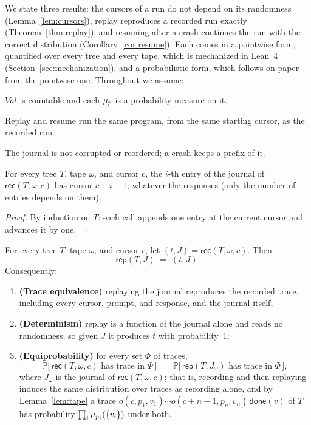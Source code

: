 
We state three results: the cursors of a run do not depend on its randomness
(Lemma~\ref{lem:cursors}), replay reproduces a recorded run exactly
(Theorem~\ref{thm:replay}), and resuming after a crash continues the run with the
correct distribution (Corollary~\ref{cor:resume}).
Each comes in a pointwise form, quantified over every tree and every tape, which is
mechanized in Lean~4 (Section~\ref{sec:mechanization}), and a probabilistic form, which
follows on paper from the pointwise one.
Throughout we assume:
\begin{description}[noitemsep]
  \item[(A1)] $\mathit{Val}$ is countable and each $\mu_{p}$ is a probability measure on it.
  \item[(A2)] Replay and resume run the same program, from the same starting cursor, as the
    recorded run.
  \item[(A3)] The journal is not corrupted or reordered; a crash keeps a prefix of it.
\end{description}

\begin{lemma}[Cursors]
\label{lem:cursors}
For every tree $T$, tape $\omega$, and cursor $c$, the $i$-th entry of the journal of
$\mathsf{rec}(T, \omega, c)$ has cursor $c+i-1$, whatever the responses (only the number of
entries depends on them).
\end{lemma}

\begin{proof}
By induction on $T$: each call appends one entry at the current cursor and advances it by one.
\end{proof}

\begin{theorem}
\label{thm:replay}
For every tree $T$, tape $\omega$, and cursor $c$, let $(t, J) = \mathsf{rec}(T, \omega, c)$.
Then
\[
  \mathsf{rep}(T, J) \;=\; (t, J).
\]
Consequently:
\begin{enumerate}[label=(\roman*), noitemsep]
  \item \textbf{(Trace equivalence)} replaying the journal reproduces the recorded trace,
    including every cursor, prompt, and response, and the journal itself;
  \item \textbf{(Determinism)} replay is a function of the journal alone and reads no
    randomness, so given $J$ it produces $t$ with probability~1;
  \item \textbf{(Equiprobability)} for every set $\Phi$ of traces,
    \[
      \mathbb{P}\bigl[\,\mathsf{rec}(T,\omega,c) \text{ has trace in } \Phi\,\bigr]
      \;=\;
      \mathbb{P}\bigl[\,\mathsf{rep}(T, J_\omega) \text{ has trace in } \Phi\,\bigr],
    \]
    where $J_\omega$ is the journal of $\mathsf{rec}(T,\omega,c)$; that is, recording and then
    replaying induces the same distribution over traces as recording alone, and by
    Lemma~\ref{lem:tape} a trace $o(c,p_1,v_1)\cdots o(c{+}n{-}1,p_n,v_n)\,\mathsf{done}(v)$
    of $T$ has probability $\prod_i \mu_{p_i}(\{v_i\})$ under both.
\end{enumerate}
\end{theorem}

